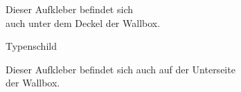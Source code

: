 \documentclass[a4paper,10pt]{article}
\begin{document}
\begin{multicols*}{2}
\begin{tcolorbox}[width=4.2cm,height=2.7cm, boxrule=0.25mm]
	\end{tcolorbox}
	Dieser Aufkleber befindet sich\\ auch unter dem Deckel der Wallbox.
	\columnbreak

	\null
	\vfill
	Typenschild
	\begin{tcolorbox}[width=7.8cm,height=4.1cm, boxrule=0.25mm]

	\end{tcolorbox}
	Dieser Aufkleber befindet sich auch auf der Unterseite\\ der Wallbox.
\end{multicols*}
\end{document}
